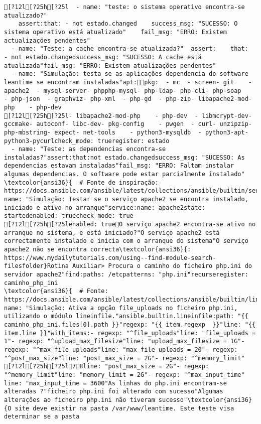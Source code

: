 \documentclass{scrartcl}
\begin{document}
\begin{Verbatim}
[?12l[?25h[?25l  - name: "teste: o sistema operativo encontra-se atualizado?"
    assert:that: - not estado.changed    success_msg: "SUCESSO: O sistema operativo está atualizado"    fail_msg: "ERRO: Existem actualizações pendentes"
  - name: "Teste: a cache encontra-se atualizada?"  assert:    that:  - not estado.changedsuccess_msg: "SUCESSO: A cache está atualizada"fail_msg: "ERRO: Existem atualizações pendentes"
  - name: "Simulação: testa se as aplicações dependencia do software leantime se encontram instaladas"apt:pkg:  - mc  - screen- git    - apache2  - mysql-server- phpphp-mysql- php-ldap- php-cli- php-soap    - php-json  - graphviz- php-xml  - php-gd  - php-zip- libapache2-mod-php    - php-dev
[?12l[?25h[?25l- libapache2-mod-php    - php-dev  - libmcrypt-dev- gccmake- autoconf- libc-dev- pkg-config    - pwgen  - curl- unzipzip- php-mbstring- expect- net-tools    - python3-mysqldb  - python3-apt- python3-pycurlcheck_mode: trueregister: estado
  - name: "Teste: as dependencias encontra-se instaladas?"assert:that:not estado.changedsuccess_msg: "SUCESSO: As dependencias estavam instaladas"fail_msg: "ERRO: Faltam instalar algumas dependencias. O software pode estar parcialmente instalado"
\textcolor{ansi36}{  # Fonte de inspiração: https://docs.ansible.com/ansible/latest/collections/ansible/builtin/service_module.html}- name: "Simulação: Testar se o serviço apache2 se encontra instalado, iniciado e ativo no arranque"service:name: apache2state: startedenabled: truecheck_mode: true
[?12l[?25h[?25lenabled: trueO serviço apache2 encontra-se ativo no arranque no sistema, e está iniciado?"O serviço apache2 está correctamente instalado e inicia com o arranque do sistema"O serviço apache2 não se encontra correcta\textcolor{ansi36}{: https://www.mydailytutorials.com/using--find-module-search-filesfolder}Rotina Auxiliar> Procura o caminho do ficheiro php.ini do servidor apache2"find:paths: /etcpatterns: "php.ini"recurseregister: caminho_php_ini
\textcolor{ansi36}{  # Fonte: https://docs.ansible.com/ansible/latest/collections/ansible/builtin/lineinfile_module.html}- name: "Simulação: Ativa a opção file_uploads no ficheiro php.ini, utilizando o módulo lineinfile."ansible.builtin.lineinfile:path: "{{ caminho_php_ini.files[0].path }}"regexp: "{{ item.regexp  }}"line: "{{ item.line }}"with_items:- regexp: "^file_uploads"line: "file_uploads = 1"- regexp: "^upload_max_filesize"line: "upload_max_filesize = 1G"- regexp: "^max_file_uploads"line: "max_file_uploads = 20"- regexp: "^post_max_size"line: "post_max_size = 2G"- regexp: "^memory_limit"
[?12l[?25h[?25l78line: "post_max_size = 2G"- regexp: "^memory_limit"line: "memory_limit = 2G"- regexp: "^max_input_time"  line: "max_input_time = 3600"As linhas do php.ini encontram-se alteradas ?"ficheiro php.ini foi alterado com sucesso"Algumas alterações ao ficheiro php.ini não tiveram sucesso"\textcolor{ansi36}{O site deve existir na pasta /var/www/leantime. Este teste visa determinar se a pasta

\end{Verbatim}
\end{document}
